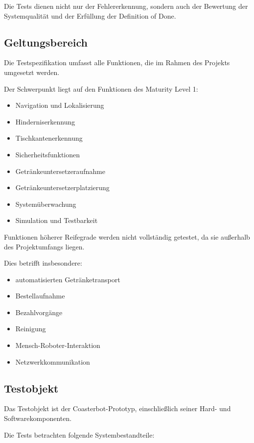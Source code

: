 \documentclass[
  a4paper,
  12pt,
  DIV=12,        %
  parskip=half,  %
  headings=small %
]{scrartcl}
\theoremstyle{definition}
\providecommand{\tightlist}{%
  \setlength{\itemsep}{0pt}\setlength{\parskip}{0pt}}
\theoremstyle{definition}
\begin{document}
Die Tests dienen nicht nur der Fehlererkennung, sondern auch der
Bewertung der Systemqualität und der Erfüllung der Definition of Done.

\subsection{Geltungsbereich}\label{geltungsbereich}

Die Testspezifikation umfasst alle Funktionen, die im Rahmen des
Projekts umgesetzt werden.

Der Schwerpunkt liegt auf den Funktionen des Maturity Level 1:

\begin{itemize}
\tightlist
\item
  Navigation und Lokalisierung
\item
  Hinderniserkennung
\item
  Tischkantenerkennung
\item
  Sicherheitsfunktionen
\item
  Getränkeuntersetzeraufnahme
\item
  Getränkeuntersetzerplatzierung
\item
  Systemüberwachung
\item
  Simulation und Testbarkeit
\end{itemize}

Funktionen höherer Reifegrade werden nicht vollständig getestet, da sie
außerhalb des Projektumfangs liegen.

Dies betrifft insbesondere:

\begin{itemize}
\tightlist
\item
  automatisierten Getränketransport
\item
  Bestellaufnahme
\item
  Bezahlvorgänge
\item
  Reinigung
\item
  Mensch-Roboter-Interaktion
\item
  Netzwerkkommunikation
\end{itemize}

\subsection{Testobjekt}\label{testobjekt}

Das Testobjekt ist der Coasterbot-Prototyp, einschließlich seiner Hard-
und Softwarekomponenten.

Die Tests betrachten folgende Systembestandteile:
\end{document}
